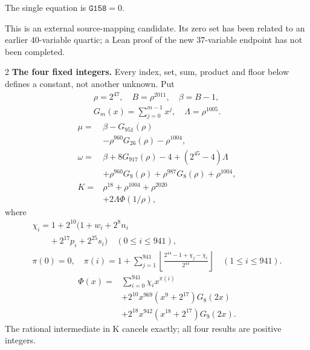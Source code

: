 \documentclass[10pt]{article}
\newcommand{\fl}[1]{\left\lfloor#1\right\rfloor}
\begin{document}
\noindent The single equation is $\boxed{\mathtt{G158}=0}$.
\par\medskip
This is an external source-mapping candidate. Its zero set has been related to
an earlier 40-variable quartic; a Lean proof of the new 37-variable endpoint
has not been completed.
\bigskip
\begin{multicols}{2}\fontsize{7.7}{8.2}\selectfont
\textbf{The four fixed integers.}
Every index, set, sum, product and floor below defines a constant, not
another unknown. Put
\[
\begin{gathered}
\rho=2^{47},\quad B=\rho^{2011},\quad\beta=B-1,\\
G_m(x)=\sum_{j=0}^{m-1}x^j,\quad
\Lambda=\rho^{1005}.
\end{gathered}
\]
\begin{align*}
\mu={}&\beta-G_{951}(\rho)\\
&-\rho^{960}G_{26}(\rho)-\rho^{1004},\\
\omega={}&\beta+8G_{917}(\rho)-4+(2^{45}-4)\Lambda\\
&+\rho^{960}G_9(\rho)+\rho^{987}G_8(\rho)
  +\rho^{1004},\\
K={}&\rho^{18}+\rho^{1004}+\rho^{2020}\\
&+2\Lambda\Phi(1/\rho),
\end{align*}
where
\[
\begin{gathered}
\chi_i=1+2^{10}(1+w_i+2^8n_i\\
\qquad+2^{17}p_i+2^{25}s_i)\quad(0\le i\le941),\\
\pi(0)=0,\quad\pi(i)=1+\sum_{j=1}^{941}
\fl{\frac{2^{44}-1+\chi_j-\chi_i}{2^{44}}}\quad(1\le i\le941).
\end{gathered}
\]
\[
\begin{split}
\Phi(x)={}&\sum_{i=0}^{941}\chi_i x^{\pi(i)}\\
&+2^{10}x^{969}(x^9+2^{17})G_8(2x)\\
&+2^{18}x^{942}(x^{18}+2^{17})G_9(2x).
\end{split}
\]
The rational intermediate in K cancels exactly; all four results are positive integers.


\end{multicols}
\end{document}
